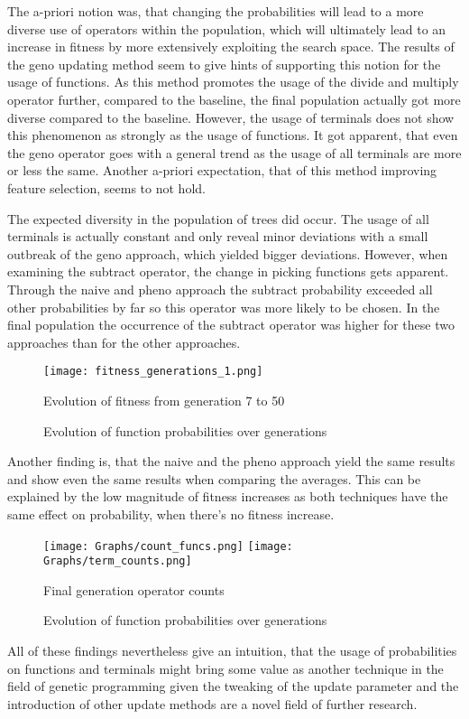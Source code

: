 \documentclass[12pt]{article}
\begin{document}
The a-priori notion was, that changing the probabilities will lead to a more diverse use of operators within the population, which will ultimately lead to an increase in fitness by more extensively exploiting the search space. The results of the geno updating method seem to give hints of supporting this notion for the usage of functions. As this method promotes the usage of the divide and multiply operator further, compared to the baseline, the final population actually got more diverse compared to the baseline. However, the usage of terminals does not show this phenomenon as strongly as the usage of functions. It got apparent, that even the geno operator goes with a general trend as the usage of all terminals are more or less the same. Another a-priori expectation, that of this method improving feature selection, seems to not hold.

The expected diversity in the population of trees did occur. The usage of all terminals is actually constant and only reveal minor deviations with a small outbreak of the geno approach, which yielded bigger deviations. However, when examining the subtract operator, the change in picking functions gets apparent. Through the naive and pheno approach the subtract probability exceeded all other probabilities by far so this operator was more likely to be chosen. In the final population the occurrence of the subtract operator was higher for these two approaches than for the other approaches.
\begin{figure}[H]
\begin{center}
\texttt{[image: fitness\_generations\_1.png]}
\caption{Evolution of fitness from generation 7 to 50}
\end{center}
\caption{Evolution of function probabilities over generations}
\centering
\end{figure}
Another finding is, that the naive and the pheno approach yield the same results and show even the same results when comparing the averages. This can be explained by the low magnitude of fitness increases as both techniques have the same effect on probability, when there's no fitness increase.

\begin{figure}[H]
\begin{center}
\texttt{[image: Graphs/count\_funcs.png]}
\texttt{[image: Graphs/term\_counts.png]}
\caption{Final generation operator counts}
\end{center}
\caption{Evolution of function probabilities over generations}
\centering
\end{figure}
 All of these findings nevertheless give an intuition, that the usage of probabilities on functions and terminals might bring some value as another technique in the field of genetic programming given the tweaking of the update parameter and the introduction of other update methods are a novel field of further research.
\end{document}
